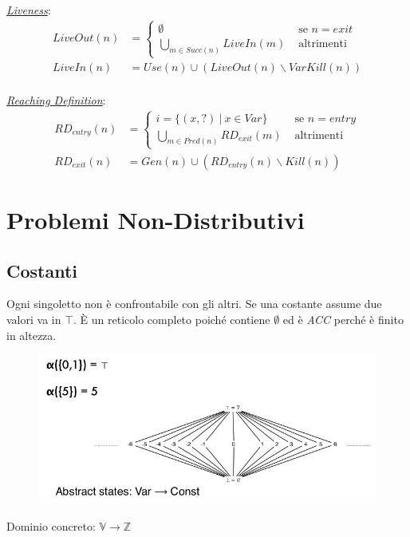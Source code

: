 \documentclass[a4paper, 10pt]{book}
\begin{document}
\textit{\underline{Liveness}}:
\begin{align*}
	LiveOut(n) &=
	\begin{cases}
		\emptyset &\text{ se $n= exit$} \\
		\bigcup_{m\in Succ(n)} LiveIn(m) &\text{ altrimenti}
	\end{cases}\\
	LiveIn(n) &= Use(n) \cup (LiveOut(n)\backslash VarKill(n))
\end{align*}
\\

\textit{\underline{Reaching Definition}}:
\begin{align*}
	RD_{entry}(n) &=
	\begin{cases}
		i=\{(x, ?) ~|~ x\in Var \} &\text{ se $n= entry$} \\
		\bigcup_{m\in Pred(n)} RD_{exit}(m) &\text{ altrimenti}
	\end{cases}\\
	RD_{exit}(n) &= Gen(n) \cup (RD_{entry}(n)\backslash Kill(n))
\end{align*}


\newpage
\section{Problemi Non-Distributivi}

\subsection{Costanti}
Ogni singoletto non è confrontabile con gli altri. Se una costante assume due valori va in $\top$. \MakeUppercase{è} un reticolo completo poiché contiene $\emptyset$ ed è \textit{ACC} perché è finito in altezza.
\begin{figure}[H]
	\centering
	\includegraphics[scale=0.32]{pngs/Const}
\end{figure}

Dominio concreto: $\mathbb{V}\rightarrow \mathbb{Z}$
\end{document}
